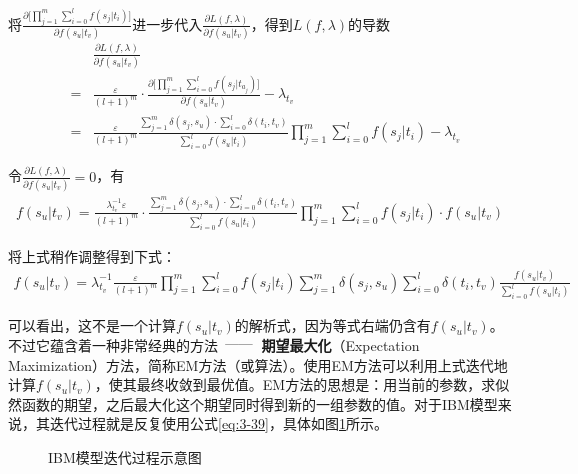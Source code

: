 \parinterval 将$\frac{\partial \big[ \prod_{j=1}^{m} \sum_{i=0}^{l} f(s_j|t_i) \big]}{\partial f(s_u|t_v)}$进一步代入$\frac{\partial L(f,\lambda)}{\partial f(s_u|t_v)}$，得到$L(f,\lambda)$的导数
\begin{eqnarray}
& &{\frac{\partial L(f,\lambda)}{\partial f(s_u|t_v)}}\nonumber \\
&=&{\frac{\varepsilon}{(l+1)^{m}} \cdot \frac{\partial \big[ \prod\limits_{j=1}^{m} \sum\limits_{i=0}^{l} f(s_j|t_{a_j}) \big]}{\partial f(s_u|t_v)} - \lambda_{t_v}}\nonumber \\
&=&{\frac{\varepsilon}{(l+1)^{m}} \frac{\sum_{j=1}^{m} \delta(s_j,s_u) \cdot \sum_{i=0}^{l} \delta(t_i,t_v)}{\sum_{i=0}^{l}f(s_u|t_i)} \prod\limits_{j=1}^{m} \sum\limits_{i=0}^{l} f(s_j|t_i) - \lambda_{t_v}}
\label{eq:3-37}
\end{eqnarray}

\parinterval 令$\frac{\partial L(f,\lambda)}{\partial f(s_u|t_v)}=0$，有
\begin{eqnarray}
f(s_u|t_v) = \frac{\lambda_{t_v}^{-1} \varepsilon}{(l+1)^{m}} \cdot \frac{\sum\limits_{j=1}^{m} \delta(s_j,s_u) \cdot \sum\limits_{i=0}^{l} \delta(t_i,t_v)}{\sum\limits_{i=0}^{l}f(s_u|t_i)} \prod\limits_{j=1}^{m} \sum\limits_{i=0}^{l} f(s_j|t_i) \cdot f(s_u|t_v)
\label{eq:3-38}
\end{eqnarray}

\noindent \hspace{2em} 将上式稍作调整得到下式：
\begin{eqnarray}
f(s_u|t_v) = \lambda_{t_v}^{-1} \frac{\varepsilon}{(l+1)^{m}} \prod\limits_{j=1}^{m} \sum\limits_{i=0}^{l} f(s_j|t_i) \sum\limits_{j=1}^{m} \delta(s_j,s_u) \sum\limits_{i=0}^{l} \delta(t_i,t_v) \frac{f(s_u|t_v) }{\sum\limits_{i=0}^{l}f(s_u|t_i)}
\label{eq:3-39}
\end{eqnarray}

\noindent \hspace{2em}  可以看出，这不是一个计算$f(s_u|t_v)$的解析式，因为等式右端仍含有$f(s_u|t_v)$。不过它蕴含着一种非常经典的方法\ $\dash$\ {\small\sffamily\bfseries{期望最大化}}（Expectation Maximization）方法，简称EM方法（或算法）。使用EM方法可以利用上式迭代地计算$f(s_u|t_v)$，使其最终收敛到最优值。EM方法的思想是：用当前的参数，求似然函数的期望，之后最大化这个期望同时得到新的一组参数的值。对于IBM模型来说，其迭代过程就是反复使用公式\ref{eq:3-39}，具体如图\ref{fig:3-24}所示。

\begin{figure}[htp]
    \centering

   \caption{IBM模型迭代过程示意图}
   \label{fig:3-24}
\end{figure}

